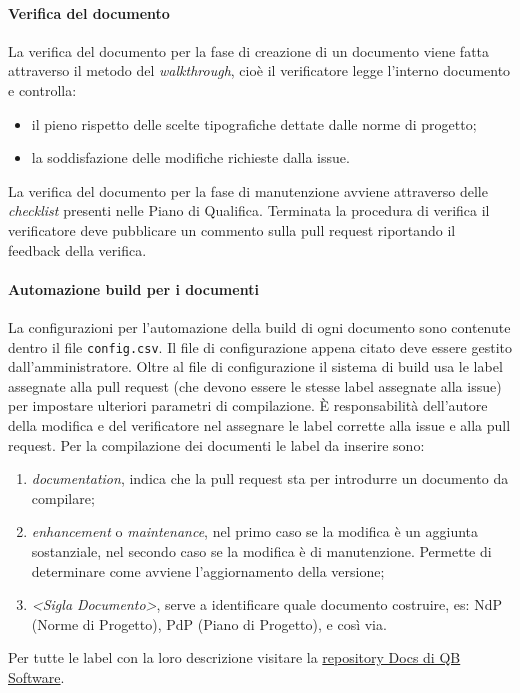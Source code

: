         \paragraph{Verifica del documento} \label{sec:doc_verification}%
            La verifica del documento per la fase di creazione di un documento viene fatta attraverso il metodo del \emph{walkthrough}, cioè il verificatore legge l'interno documento e controlla:
                \begin{itemize}
                    \item il pieno rispetto delle scelte tipografiche dettate dalle norme di progetto;
                    \item la soddisfazione delle modifiche richieste dalla issue.
                \end{itemize}
            La verifica del documento per la fase di manutenzione avviene attraverso delle \emph{checklist} presenti nelle Piano di Qualifica. Terminata la procedura di verifica il verificatore deve pubblicare un commento sulla pull request riportando il feedback della verifica.
            
		\paragraph{Automazione build per i documenti} \label{sec:doc_CM}%
		    La configurazioni per l'automazione della build di ogni documento sono contenute dentro il file \verb|config.csv|. Il file di configurazione appena citato deve essere gestito dall'amministratore.
		    Oltre al file di configurazione il sistema di build usa le label assegnate alla pull request (che devono essere le stesse label assegnate alla issue) per impostare ulteriori parametri di compilazione.
		    È responsabilità dell'autore della modifica e del verificatore nel assegnare le label corrette alla issue e alla pull request. Per la compilazione dei documenti le label da inserire sono:
		    \begin{enumerate}
		    	\item \emph{documentation}, indica che la pull request sta per introdurre un documento da compilare;
		    	\item \emph{enhancement} o \emph{maintenance}, nel primo caso se la modifica è un aggiunta sostanziale, nel secondo caso se la modifica è di manutenzione. Permette di determinare come avviene l'aggiornamento della versione;
		    	\item \emph{<Sigla Documento>}, serve a identificare quale documento costruire, es: NdP (Norme di Progetto), PdP (Piano di Progetto), e così via.
		    \end{enumerate}
		    Per tutte le label con la loro descrizione visitare la \href{https://github.com/QB-Software-swe/docs/labels}{repository Docs di QB Software}.
            

